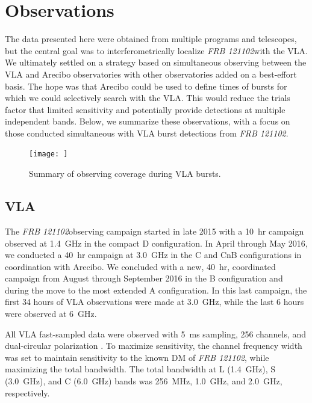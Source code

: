 \documentclass{emulateapj}
\newcommand{\frb}{\emph{FRB 121102}}
\begin{document}
\section{Observations}
The data presented here were obtained from multiple programs and telescopes, but the central goal was to interferometrically localize \frb with the VLA. We ultimately settled on a strategy based on simultaneous observing between the VLA and Arecibo observatories with other observatories added on a best-effort basis. The hope was that Arecibo could be used to define times of bursts for which we could selectively search with the VLA. This would reduce the trials factor that limited sensitivity and potentially provide detections at multiple independent bands. Below, we summarize these observations, with a focus on those conducted simultaneous with VLA burst detections from \frb.

\begin{figure}[htb]
\begin{center}
\texttt{[image: ]}
\caption{Summary of observing coverage during VLA bursts.
\label{fig:multi}}
\end{center}
\end{figure}

\subsection{VLA}
The \frb observing campaign started in late 2015 with a 10~hr campaign observed at 1.4~GHz in the compact D configuration. In April through May 2016, we conducted a 40~hr campaign at 3.0~GHz in the C and CnB configurations in coordination with Arecibo. We concluded with a new, 40~hr, coordinated campaign from August through September 2016 in the B configuration and during the move to the most extended A configuration. In this last campaign, the first 34 hours of VLA observations were made at 3.0~GHz, while the last 6 hours were observed at 6~GHz.

All VLA fast-sampled data were observed with 5~ms sampling, 256 channels, and dual-circular polarization \citep[as in]{2015ApJ...807...16L}. To maximize sensitivity, the channel frequency width was set to maintain sensitivity to the known DM of \frb, while maximizing the total bandwidth. The total bandwidth at L (1.4~GHz), S (3.0~GHz), and C (6.0~GHz) bands was 256~MHz, 1.0~GHz, and 2.0~GHz, respectively.
\end{document}
